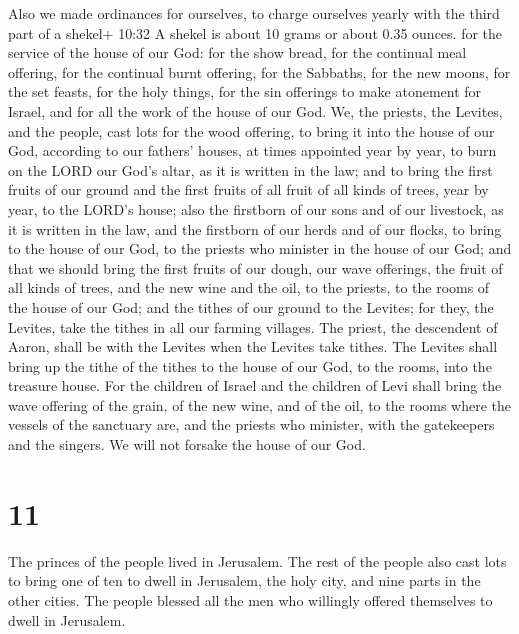  Also we made ordinances for ourselves, to charge ourselves
yearly with the third part of a shekel+ 10:32 A shekel is about 10 grams
or about 0.35 ounces. for the service of the house of our God:
 for the show bread, for the continual meal offering, for
the continual burnt offering, for the Sabbaths, for the new moons, for
the set feasts, for the holy things, for the sin offerings to make
atonement for Israel, and for all the work of the house of our God.
 We, the priests, the Levites, and the people, cast lots
for the wood offering, to bring it into the house of our God, according
to our fathers' houses, at times appointed year by year, to burn on the
LORD our God's altar, as it is written in the law;  and to
bring the first fruits of our ground and the first fruits of all fruit
of all kinds of trees, year by year, to the LORD's house; 
also the firstborn of our sons and of our livestock, as it is written in
the law, and the firstborn of our herds and of our flocks, to bring to
the house of our God, to the priests who minister in the house of our
God;  and that we should bring the first fruits of our
dough, our wave offerings, the fruit of all kinds of trees, and the new
wine and the oil, to the priests, to the rooms of the house of our God;
and the tithes of our ground to the Levites; for they, the Levites, take
the tithes in all our farming villages.  The priest, the
descendent of Aaron, shall be with the Levites when the Levites take
tithes. The Levites shall bring up the tithe of the tithes to the house
of our God, to the rooms, into the treasure house.  For the
children of Israel and the children of Levi shall bring the wave
offering of the grain, of the new wine, and of the oil, to the rooms
where the vessels of the sanctuary are, and the priests who minister,
with the gatekeepers and the singers. We will not forsake the house of
our God.

\hypertarget{section-10}{%
\section{11}\label{section-10}}

 The princes of the people lived in Jerusalem. The rest of
the people also cast lots to bring one of ten to dwell in Jerusalem, the
holy city, and nine parts in the other cities.  The people
blessed all the men who willingly offered themselves to dwell in
Jerusalem.

